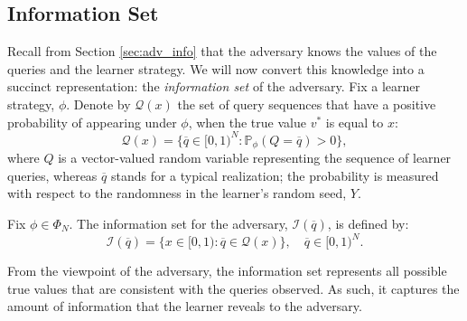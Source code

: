 \documentclass[final,12pt]{colt2018}
\def\pb{\mathbb{P}}
\def\calQ{\mathcal{Q}}
\begin{document}
\subsection{Information Set} \label{sec:infoconfiset}
Recall from Section \ref{sec:adv_info} that the adversary knows the values of the queries and the {learner} strategy. We will now convert this knowledge into a succinct representation: the \emph{information set} of the adversary. Fix a {learner} strategy, $\phi$. Denote by $\calQ(x)$ the set of query sequences that have a positive probability of appearing under $\phi$, when the true value $v^*$ is equal to $x$: 
\begin{equation}
\calQ(x)  =\{{\overline{q}} \in [0,1)^N: \pb_\phi(Q = {\overline{q}}) >0 \},
\label{eq:calQx}
\end{equation}
{where $Q$ is a vector-valued random variable representing the sequence of learner queries, whereas $\overline{q}$ stands for a typical realization;
{the probability is measured with respect to the randomness in the learner's random seed, $Y$.}}
\begin{definition} \label{def:infoset}
Fix $\phi\in\Phi_N$. %
The information set for the adversary, $\mathcal{I}({\overline{q}})$, is defined by: 
\begin{equation}
\mathcal{I}({\overline{q}}) = \Big\{x\in [0 , 1): {\overline{q}} \in \calQ(x) \Big\}, {\quad\overline{q}\in[0,1)^N.}
\end{equation}
\end{definition}
From the viewpoint of the adversary, the {information set} represents all possible {true values} {that are consistent with the queries observed}. As such, it captures the amount of information that the {learner} reveals to the adversary. 
\end{document}
